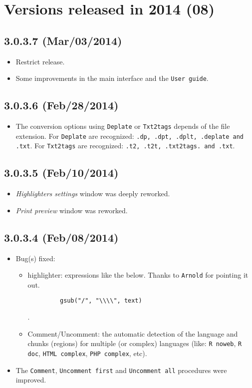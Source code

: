 
\hypertarget{2014}{}
\section{Versions released in 2014 (08)}

\subsection*{3.0.3.7 (Mar/03/2014)}
\begin{itemize}
  \item Restrict release.
  \item Some improvements in the main interface and the \texttt{User guide}.
\end{itemize}


\subsection*{3.0.3.6 (Feb/28/2014)}
\begin{itemize}
  \item The conversion options using \texttt{Deplate} or \texttt{Txt2tags} depends of the file extension.
    For \texttt{Deplate} are recognized: \texttt{.dp, .dpt, .dplt, .deplate and .txt}.
    For \texttt{Txt2tags} are recognized: \texttt{.t2, .t2t, .txt2tags. and .txt}.
\end{itemize}


\subsection*{3.0.3.5 (Feb/10/2014)}
\begin{itemize}
  \item \textit{Highlighters settings} window was deeply reworked.
  \item \textit{Print preview} window was reworked.
\end{itemize}


\subsection*{3.0.3.4 (Feb/08/2014)}
\begin{itemize}
  \item Bug(s) fixed:
    \begin{itemize}
      \item \RR{} highlighter: expressions like the below. Thanks to \texttt{Arnold} for pointing it out.
       \begin{verbatim}
         gsub("/", "\\\\", text)
       \end{verbatim}.
      \item Comment/Uncomment: the automatic detection of the language and chunks (regions) for multiple (or complex) languages
       (like: \texttt{R noweb}, \texttt{R doc}, \texttt{HTML complex}, \texttt{PHP complex}, etc).
    \end{itemize}
  \item The \texttt{Comment}, \texttt{Uncomment first} and \texttt{Uncomment all}
   procedures were improved.
\end{itemize}


